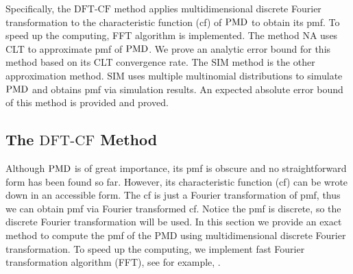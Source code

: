 \documentclass[12pt]{article}
\newcommand{\PMD}{{\normalfont\textrm{PMD}}}
\newcommand{\SIM}{{\textrm{SIM}}}
\newcommand{\NA}{{\textrm{NA}}}
\newcommand{\dft}{{\textrm{DFT-CF}}}
\begin{document}
Specifically, the $\dft$ method applies multidimensional discrete Fourier transformation to the characteristic function (cf) of $\PMD$ to obtain its pmf. To speed up the computing, FFT algorithm is implemented. The method $\NA$ uses CLT to approximate pmf of $\PMD$. We prove an analytic error bound for this method based on its CLT convergence rate. The $\SIM$ method is the other approximation method. $\SIM$ uses multiple multinomial distributions to simulate $\PMD$ and obtains pmf via simulation results. An expected absolute error bound of this method is provided and proved.

\subsection{The $\dft$ Method}
Although $\PMD$ is of great importance, its pmf is obscure and no straightforward form has been found so far. However, its characteristic function (cf) can be wrote down in an accessible form. The cf is just a Fourier transformation of pmf, thus we can obtain pmf via Fourier transformed cf. Notice the pmf is discrete, so the discrete Fourier transformation will be used. In this section we provide an exact method to compute the pmf of the PMD using multidimensional discrete Fourier transformation. To speed up the computing, we implement fast Fourier transformation algorithm (FFT), see for example, .
\end{document}
